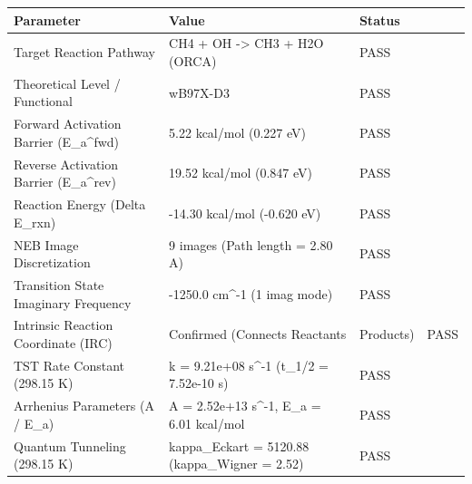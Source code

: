 \begin{tabular}{lll}
\toprule
Parameter & Value & Status \\
\midrule
Target Reaction Pathway & CH4 + OH -> CH3 + H2O (ORCA) & PASS \\
Theoretical Level / Functional & wB97X-D3 & PASS \\
Forward Activation Barrier (E_a^fwd) & 5.22 kcal/mol (0.227 eV) & PASS \\
Reverse Activation Barrier (E_a^rev) & 19.52 kcal/mol (0.847 eV) & PASS \\
Reaction Energy (Delta E_rxn) & -14.30 kcal/mol (-0.620 eV) & PASS \\
NEB Image Discretization & 9 images (Path length = 2.80 A) & PASS \\
Transition State Imaginary Frequency & -1250.0 cm^-1 (1 imag mode) & PASS \\
Intrinsic Reaction Coordinate (IRC) & Confirmed (Connects Reactants & Products) & PASS \\
TST Rate Constant (298.15 K) & k = 9.21e+08 s^-1 (t_1/2 = 7.52e-10 s) & PASS \\
Arrhenius Parameters (A / E_a) & A = 2.52e+13 s^-1, E_a = 6.01 kcal/mol & PASS \\
Quantum Tunneling (298.15 K) & kappa_Eckart = 5120.88 (kappa_Wigner = 2.52) & PASS \\
\bottomrule
\end{tabular}
